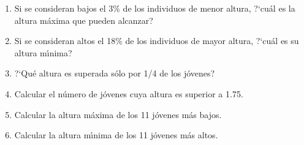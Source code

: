 \documentclass[11pt]{book}
\begin{document}
\begin{enumerate}
  \begin{enumerate}
     \item Si se consideran bajos el 3\% de los individuos de menor  altura,
           ?`cu{\'a}l es la altura m{\'a}xima que pueden alcanzar?
     \item Si se consideran altos el 18\% de los individuos de mayor  altura,
           ?`cu{\'a}l es su altura m{\'\i}nima?
     \item ?`Qu{\'e} altura es superada s{\'o}lo por 1/4 de los j{\'o}venes?
     \item Calcular el n{\'u}mero de j{\'o}venes cuya altura es superior a 1.75.
     \item Calcular la altura m{\'a}xima de los 11 j{\'o}venes m{\'a}s bajos.
     \item Calcular la altura m{\'\i}nima de los 11 j{\'o}venes m{\'a}s altos.
   \end{enumerate}


\end{enumerate}
\end{document}
